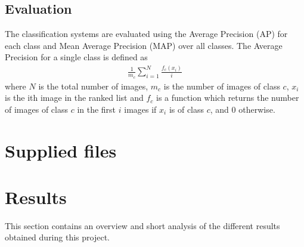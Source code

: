 \documentclass{article} %
\begin{document}
\subsection{Evaluation}
The classification systems are evaluated using the Average Precision (AP) for each class and Mean Average Precision (MAP) over all classes. The Average Precision for a single class is defined as
\begin{align}
\frac{1}{m_c} \sum\limits_{i=1}^N\frac{f_c(x_i)}{i}
\end{align}
where $N$ is the total number of images, $m_c$ is the number of images of class $c$, $x_i$ is the ith image in the ranked list and $f_c$ is a function which returns the number of images of class $c$ in the first $i$ images if $x_i$ is of class $c$, and 0 otherwise.

\section{Supplied files}


\section{Results}
This section contains an overview and short analysis of the different results obtained during this project. \\

\end{document}
